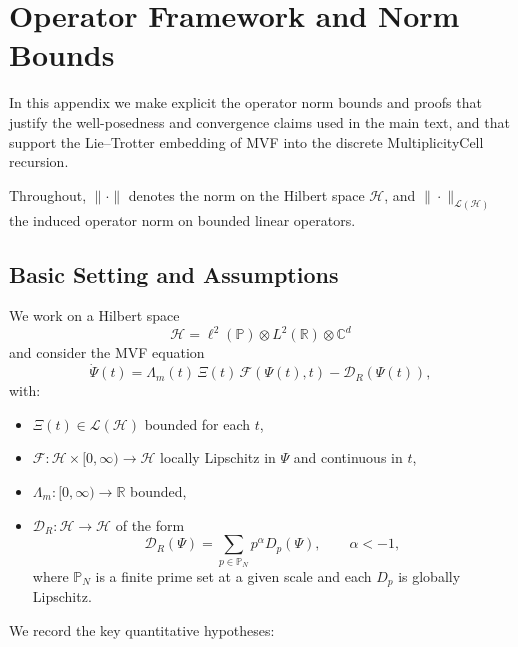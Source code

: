 \documentclass[11pt]{article}
\begin{document}
\section{Operator Framework and Norm Bounds}

In this appendix we make explicit the operator norm bounds and proofs that justify the well-posedness and convergence claims used in the main text, and that support the Lie--Trotter embedding of MVF into the discrete MultiplicityCell recursion.

Throughout, $\|\cdot\|$ denotes the norm on the Hilbert space $\mathcal{H}$, and $\|\cdot\|_{\mathcal{L}(\mathcal{H})}$ the induced operator norm on bounded linear operators.

\subsection{Basic Setting and Assumptions}

We work on a Hilbert space
\[
  \mathcal{H} = \ell^2(\mathbb{P}) \otimes L^2(\mathbb{R}) \otimes \mathbb{C}^d
\]
and consider the MVF equation
\begin{equation}
  \dot{\Psi}(t)
  =
  \Lambda_m(t)\,\Xi(t)\,\mathcal{F}(\Psi(t),t)
  - \mathcal{D}_R(\Psi(t)),
  \label{eq:MVF}
\end{equation}
with:
\begin{itemize}
  \item $\Xi(t)\in \mathcal{L}(\mathcal{H})$ bounded for each $t$,
  \item $\mathcal{F}:\mathcal{H}\times[0,\infty)\to\mathcal{H}$ locally Lipschitz in $\Psi$ and continuous in $t$,
  \item $\Lambda_m:[0,\infty)\to\mathbb{R}$ bounded,
  \item $\mathcal{D}_R:\mathcal{H}\to\mathcal{H}$ of the form
        \begin{equation}
          \mathcal{D}_R(\Psi)
          =
          \sum_{p\in\mathbb{P}_N} p^\alpha D_p(\Psi),
          \qquad \alpha < -1,
          \label{eq:DR}
        \end{equation}
        where $\mathbb{P}_N$ is a finite prime set at a given scale and each $D_p$ is globally Lipschitz.
\end{itemize}

We record the key quantitative hypotheses:
\end{document}
